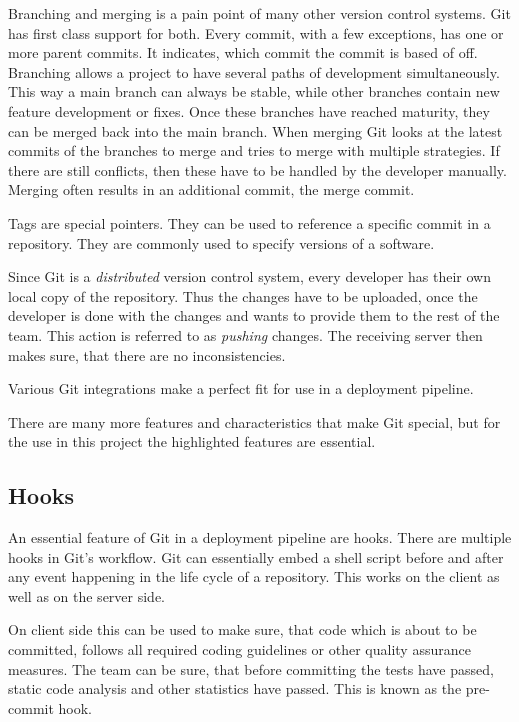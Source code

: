 Branching and merging is a pain point of many other version control systems. Git
has first class support for both. Every commit, with a few exceptions, has one
or more parent commits. It indicates, which commit the commit is based of off.
Branching allows a project to have several paths of development simultaneously.
This way a main branch can always be stable, while other branches contain new
feature development or fixes. Once these branches have reached maturity, they
can be merged back into the main branch. When merging Git looks at the latest
commits of the branches to merge and tries to merge with multiple strategies.
If there are still conflicts, then these have to be handled by the developer
manually. Merging often results in an additional commit, the merge commit.

Tags are special pointers. They can be used to reference a specific commit in a
repository. They are commonly used to specify versions of a software.

Since Git is a \textit{distributed} version control system, every developer has
their own local copy of the repository. Thus the changes have to be uploaded,
once the developer is done with the changes and wants to provide them to the
rest of the team. This action is referred to as \textit{pushing} changes. The
receiving server then makes sure, that there are no inconsistencies.

Various Git integrations make a perfect fit for use in a deployment
pipeline.

There are many more features and characteristics that make Git special, but for
the use in this project the highlighted features are essential.

\subsection{Hooks}

An essential feature of Git in a deployment pipeline are hooks. There are
multiple hooks in Git's workflow. Git can essentially embed a shell script
before and after any event happening in the life cycle of a repository. This
works on the client as well as on the server side.

On client side this can be used to make sure, that code which is about to be
committed, follows all required coding guidelines or other quality assurance
measures. The team can be sure, that before committing the tests have passed,
static code analysis and other statistics have passed. This is known as the
pre-commit hook.

